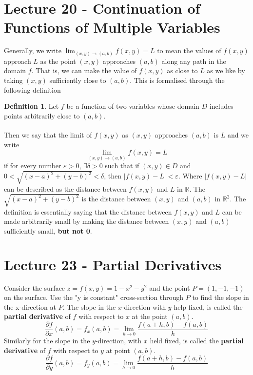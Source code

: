 \documentclass{report}
\theoremstyle{definition}
\newtheorem{definition}{Definition}
\theoremstyle{plain}
\theoremstyle{remark}
\begin{document}
    \section{Lecture 20 - Continuation of Functions of Multiple Variables}
    Generally, we write $ \displaystyle \lim_{(x,y) \to (a,b)}  f(x,y) = L $ to
    mean the values of $ f(x,y) $ approach $ L $ as the point $ (x,y)
    $ approaches $ (a,b) $ along any path in the domain $ f $. That is, we can
    make the value of $ f(x,y) $ as close to $ L $ as we like by taking $ (x,y)
    $ sufficiently close to $ (a,b) $. This is formalised through the following
    definition
    \begin{definition}
    Let $ f $ be a function of two variables whose domain $ D $ includes points
    arbitrarily close to $ (a,b) $. 
    \\\\
    Then we say that the limit of $ f(x,y) $ as $ (x,y) $ approaches $ (a,b)
    $ is $ L $ and we write
    $$ \lim_{(x,y) \to (a,b)} f(x,y) = L $$
    if for every number $ \varepsilon > 0 $, $ \exists \delta > 0 $ such that
    if $ (x,y) \in D $ and $ 0 < \sqrt{(x-a)^2 + (y-b)^2} < \delta $, then
    $ |f(x,y) - L| < \varepsilon $. Where $ |f(x,y)-L| $ can be described as
    the distance between $ f(x,y) $ and $ L $ in $ \mathbb{R} $. The
    $ \sqrt{(x-a)^2 + (y-b)^2} $ is the distance between $ (x,y) $ and $ (a,b)
    $ in $ \mathbb{R}^2 $. The definition is essentially saying that the
    distance between $ f(x,y)  $ and $ L $ can be made arbitrarily small by
    making the distance between $ (x,y)  $ and $ (a,b) $ sufficiently small,
    \textbf{but not 0}.
    \end{definition}

    \section{Lecture 23 - Partial Derivatives}
    Consider the surface $ z = f(x,y) = 1-x^2 - y^2 $ and the point
    $ P = (1,-1,-1) $ on the surface. Use the "y is constant" cross-section
    through $ P $  to find the slope in the x-direction at $ P $. The slope in
    the $ x $-direction with $ y $ help fixed, is called the \textbf{partial
    derivative} of $ f $ with respect to $ x $ at the point $ (a,b) $.
    $$ \frac{\partial f}{\partial x}(a,b) = f_x(a,b) = \lim_{h\to 0}
    \frac{f(a+h,b)-f(a,b)}{h}  $$
    Similarly for the slope in the $ y $-direction, with $ x $ held fixed, is
    called the \textbf{partial derivative} of $ f $ with respect to $ y $ at
    point $ (a,b) $.
    $$ \frac{\partial f}{\partial y} (a,b) = f_y(a,b) = \lim_{h\to 0}
    \frac{f(a+h,b) - f(a,b)}{h}	 $$
\end{document}
